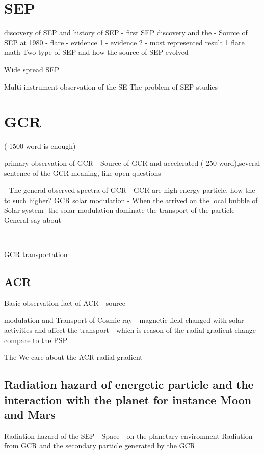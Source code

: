 \section{SEP}

discovery of SEP and history of SEP
- first SEP discovery and the 
-  Source of SEP at 1980 - flare
 - evidence 1
 - evidence 2
 - most represented result 1
flare math
Two type of SEP and how the source of SEP evolved

Wide spread SEP

Multi-instrument observation of the SE
The problem of SEP studies



\section{GCR} ( 1500 word is enough)

primary observation of GCR
	- Source of GCR and accelerated ( 250 word),several sentence of the GCR meaning, like open questions


	- The general observed spectra of GCR
	- GCR are high energy particle, how the to such higher?      
GCR solar modulation
	- When the arrived on the local bubble of Solar system- the solar modulation dominate the transport of the particle - General say about 

	- 

 GCR transportation






\subsection{ACR}

Basic observation fact of ACR
- source 

modulation and Transport of Cosmic ray - magnetic field changed with solar activities and affect the transport -  which is reason of the radial gradient change compare to the PSP 

The 
We care about the ACR radial gradient



\subsection{Radiation hazard of energetic particle and the interaction with the planet for instance Moon and Mars}

Radiation hazard of the SEP 
- Space
- on the planetary environment
Radiation from GCR and the secondary particle generated by the GCR


